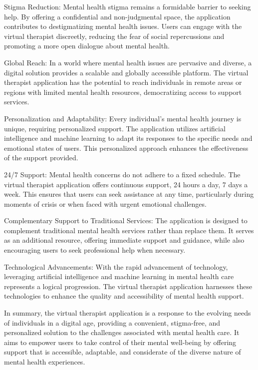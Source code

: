     Stigma Reduction: Mental health stigma remains a formidable barrier to seeking help. By offering a confidential and non-judgmental space, the application contributes to destigmatizing mental health issues. Users can engage with the virtual therapist discreetly, reducing the fear of social repercussions and promoting a more open dialogue about mental health.

    Global Reach: In a world where mental health issues are pervasive and diverse, a digital solution provides a scalable and globally accessible platform. The virtual therapist application has the potential to reach individuals in remote areas or regions with limited mental health resources, democratizing access to support services.

    Personalization and Adaptability: Every individual's mental health journey is unique, requiring personalized support. The application utilizes artificial intelligence and machine learning to adapt its responses to the specific needs and emotional states of users. This personalized approach enhances the effectiveness of the support provided.

    24/7 Support: Mental health concerns do not adhere to a fixed schedule. The virtual therapist application offers continuous support, 24 hours a day, 7 days a week. This ensures that users can seek assistance at any time, particularly during moments of crisis or when faced with urgent emotional challenges.

    Complementary Support to Traditional Services: The application is designed to complement traditional mental health services rather than replace them. It serves as an additional resource, offering immediate support and guidance, while also encouraging users to seek professional help when necessary.

    Technological Advancements: With the rapid advancement of technology, leveraging artificial intelligence and machine learning in mental health care represents a logical progression. The virtual therapist application harnesses these technologies to enhance the quality and accessibility of mental health support.

In summary, the virtual therapist application is a response to the evolving needs of individuals in a digital age, providing a convenient, stigma-free, and personalized solution to the challenges associated with mental health care. It aims to empower users to take control of their mental well-being by offering support that is accessible, adaptable, and considerate of the diverse nature of mental health experiences.




